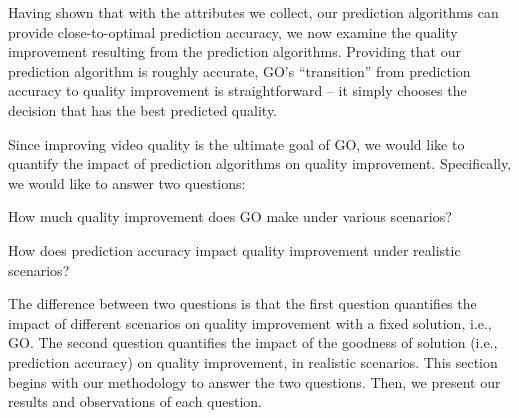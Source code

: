\label{improvement}
Having shown that with the attributes we collect, our prediction algorithms can provide close-to-optimal prediction accuracy, we now examine the quality improvement resulting from the prediction algorithms. Providing that our prediction algorithm is roughly accurate, GO's ``transition'' from prediction accuracy to quality improvement is straightforward -- it simply chooses the decision that has the best predicted quality. 

Since improving video quality is the ultimate goal of GO, we would like to quantify the impact of prediction algorithms on quality improvement. Specifically, we would like to answer two questions:
\begin{packedenumerate}
	\item How much quality improvement does GO make under various scenarios?
	\item How does prediction accuracy impact quality improvement under realistic scenarios?
\end{packedenumerate}

The difference between two questions is that the first question quantifies the impact of different scenarios on quality improvement with a fixed solution, i.e., GO. The second question quantifies the impact of the goodness of solution (i.e., prediction accuracy) on quality improvement, in realistic scenarios. This section begins with our methodology to answer the two questions. Then, we present our results and observations of each question.

